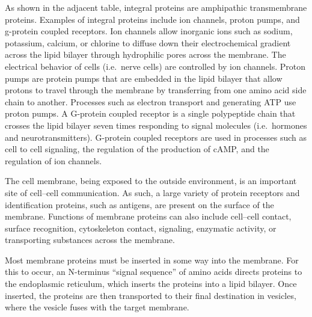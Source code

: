 As shown in the adjacent table, integral proteins are amphipathic transmembrane proteins. Examples of integral proteins include ion channels, proton pumps, and g-protein coupled receptors. Ion channels allow inorganic ions such as sodium, potassium, calcium, or chlorine to diffuse down their electrochemical gradient across the lipid bilayer through hydrophilic pores across the membrane. The electrical behavior of cells (i.e.~nerve cells) are controlled by ion channels. Proton pumps are protein pumps that are embedded in the lipid bilayer that allow protons to travel through the membrane by transferring from one amino acid side chain to another. Processes such as electron transport and generating ATP use proton pumps. A G-protein coupled receptor is a single polypeptide chain that crosses the lipid bilayer seven times responding to signal molecules (i.e.~hormones and neurotransmitters). G-protein coupled receptors are used in processes such as cell to cell signaling, the regulation of the production of cAMP, and the regulation of ion channels.

The cell membrane, being exposed to the outside environment, is an important site of cell--cell communication. As such, a large variety of protein receptors and identification proteins, such as antigens, are present on the surface of the membrane. Functions of membrane proteins can also include cell--cell contact, surface recognition, cytoskeleton contact, signaling, enzymatic activity, or transporting substances across the membrane.

Most membrane proteins must be inserted in some way into the membrane. For this to occur, an N-terminus ``signal sequence'' of amino acids directs proteins to the endoplasmic reticulum, which inserts the proteins into a lipid bilayer. Once inserted, the proteins are then transported to their final destination in vesicles, where the vesicle fuses with the target membrane.

